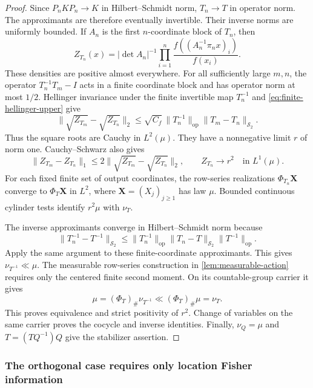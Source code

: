\begin{proof}
Since $P_nKP_n\to K$ in Hilbert--Schmidt norm, $T_n\to T$ in
operator norm.
The approximants are therefore eventually invertible.
Their inverse norms are uniformly bounded.
If $A_n$ is the first $n$-coordinate block of $T_n$, then
\begin{equation}
 Z_{T_n}(x)=|\det A_n|^{-1}
     \prod_{i=1}^n\frac{f((A_n^{-1}\pi_n x)_i)}{f(x_i)}.
 \label{eq:finite-approximant-density}
\end{equation}
These densities are positive almost everywhere.
For all sufficiently large $m,n$, the operator $T_n^{-1}T_m-I$
acts in a finite coordinate block and has operator norm at most $1/2$.
Hellinger invariance under the finite invertible map $T_n^{-1}$ and
\eqref{eq:finite-hellinger-upper} give
\begin{equation}
 \|\sqrt{Z_{T_m}}-\sqrt{Z_{T_n}}\|_2
 \le\sqrt{C_f}\,\|T_n^{-1}\|_{\mathrm{op}}
                    \|T_m-T_n\|_{\mathcal S_2}.
 \label{eq:approximant-hellinger-cauchy}
\end{equation}
Thus the square roots are Cauchy in $L^2(\mu)$.
They have a nonnegative limit $r$ of norm one.
Cauchy--Schwarz also gives
\begin{equation}
 \|Z_{T_m}-Z_{T_n}\|_1\le2\|\sqrt{Z_{T_m}}-\sqrt{Z_{T_n}}\|_2,
 \qquad Z_{T_n}\longrightarrow r^2\quad\text{in }L^1(\mu).
 \label{eq:approximant-l1-cauchy}
\end{equation}
For each fixed finite set of output coordinates, the row-series
realizations $\Phi_{T_n}\mathbf X$ converge to $\Phi_T\mathbf X$ in $L^2$,
where $\mathbf X=(X_j)_{j\ge1}$ has law $\mu$.
Bounded continuous cylinder tests identify $r^2\mu$ with $\nu_T$.

The inverse approximants converge in Hilbert--Schmidt norm because
\[
 \|T_n^{-1}-T^{-1}\|_{\mathcal S_2}
 \le\|T_n^{-1}\|_{\mathrm{op}}
       \|T_n-T\|_{\mathcal S_2}\|T^{-1}\|_{\mathrm{op}}.
\]
Apply the same argument to these finite-coordinate approximants.
This gives $\nu_{T^{-1}}\ll\mu$.
The measurable row-series construction in
\cref{lem:measurable-action} requires only the centered finite
second moment.
On its countable-group carrier it gives
\[
 \mu=(\Phi_T)_\#\nu_{T^{-1}}
       \ll(\Phi_T)_\#\mu=\nu_T.
\]
This proves equivalence and strict positivity of $r^2$.
Change of variables on the same carrier proves the cocycle and inverse
identities.
Finally, $\nu_Q=\mu$ and $T=(TQ^{-1})Q$ give the stabilizer
assertion.
\end{proof}

\subsubsection{The orthogonal case requires only location Fisher information}
\label{sec:orthogonal-transformations}

